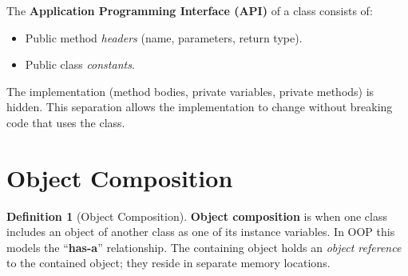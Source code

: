 \documentclass[11pt, a4paper, notitlepage]{report}
\theoremstyle{definition}
\newtheorem{definition}[theorem]{Definition}
\theoremstyle{remark}
\theoremstyle{definition}
\begin{document}
\begin{keyresult}[title={Key Result: The Public Interface (API)}]
The \textbf{Application Programming Interface (API)} of a class consists of:
\begin{itemize}
  \item Public method \emph{headers} (name, parameters, return type).
  \item Public class \emph{constants}.
\end{itemize}
The implementation (method bodies, private variables, private methods) is hidden. This separation allows the implementation to change without breaking code that uses the class.
\end{keyresult}

\section{Object Composition}
\label{sec:ch2-composition}

\begin{definition}[Object Composition]
\label{def:ch2-composition}
\textbf{Object composition} is when one class includes an object of another class as one of its instance variables. In OOP this models the ``\textbf{has-a}'' relationship. The containing object holds an \emph{object reference} to the contained object; they reside in separate memory locations.
\end{definition}
\end{document}
